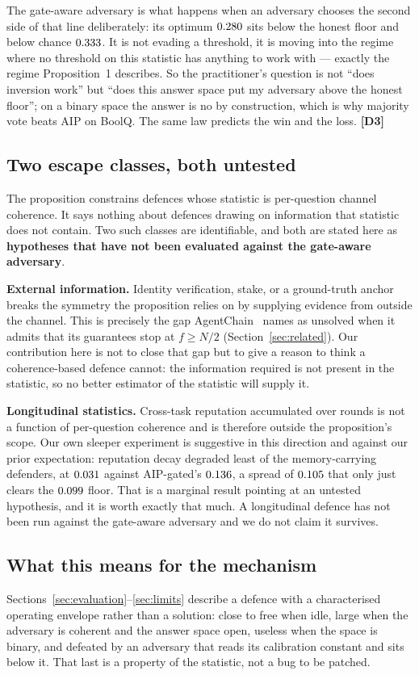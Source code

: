 The gate-aware adversary is what happens when an adversary chooses the second
side of that line deliberately: its optimum $0.280$ sits below the
honest floor and below chance $0.333$. It is not evading a threshold,
it is moving into the regime where no threshold on this statistic has anything to
work with --- exactly the regime Proposition~1 describes. So the practitioner's
question is not ``does inversion work'' but ``does this answer space put my
adversary above the honest floor''; on a binary space the answer is no by
construction, which is why majority vote beats AIP on BoolQ. The same law
predicts the win and the loss. \textbf{[D3]}

\subsection{Two escape classes, both untested}

The proposition constrains defences whose statistic is per-question channel
coherence. It says nothing about defences drawing on information that statistic
does not contain. Two such classes are identifiable, and both are stated here as
\textbf{hypotheses that have not been evaluated against the gate-aware
adversary}.

\textbf{External information.} Identity verification, stake, or a ground-truth
anchor breaks the symmetry the proposition relies on by supplying evidence from
outside the channel. This is precisely the gap AgentChain~\cite{agentchain}
names as unsolved when it admits that its guarantees stop at $f \geq N/2$
(Section~\ref{sec:related}). Our contribution here is not to close that gap but
to give a reason to think a coherence-based defence cannot: the information
required is not present in the statistic, so no better estimator of the statistic
will supply it.

\textbf{Longitudinal statistics.} Cross-task reputation accumulated over rounds
is not a function of per-question coherence and is therefore outside the
proposition's scope. Our own sleeper experiment is suggestive in this direction
and against our prior expectation: reputation decay degraded least of the
memory-carrying defenders, at $0.031$ against AIP-gated's
$0.136$, a spread of $0.105$ that only just clears
the $0.099$ floor. That is a marginal result pointing at an untested
hypothesis, and it is worth exactly that much. A longitudinal defence has not
been run against the gate-aware adversary and we do not claim it survives.

\subsection{What this means for the mechanism}

Sections~\ref{sec:evaluation}--\ref{sec:limits} describe a defence with a
characterised operating envelope rather than a solution: close to free when idle,
large when the adversary is coherent and the answer space open, useless when the
space is binary, and defeated by an adversary that reads its calibration constant
and sits below it. That last is a property of the statistic, not a bug to be
patched.
